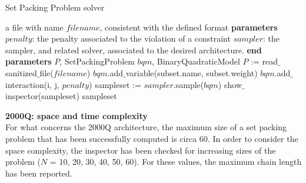 \documentclass[oneside,a4paper]{article}
\begin{document}
\begin{algorithm}
\caption{Set Packing Problem solver}
\begin{algorithmic}[1]
\Require a file with name $filename$, consistent with the defined format
\State \textbf{parameters}
\Indent
    \State $penalty$: the penalty associated to the violation of a constraint
    \State $sampler$: the sampler, and related solver, associated to the desired architecture.
\EndIndent
\State \textbf{end parameters}
\Variables
 \State $P$, SetPackingProblem
 \State $bqm$, BinaryQuadraticModel
\EndVariables
\State $P$ := read$\_$sanitized$\_$file($filename$)  
        \State $bqm$.add$\_$variable(subset.name, subset.weight)   
\EndFor  \label{loop2}
            \State $bqm$.add$\_$interaction(i, j, $penalty$)   
        \EndFor
    \EndFor
\EndFor  \label{loop3}
\State sampleset := $sampler$.sample($bqm$) 
\State show$\_$inspector(sampleset) 
\State \Return sampleset 
\EndProcedure
\end{algorithmic}
\end{algorithm}

\textbf{2000Q: space and time complexity} \\

For what concerns the 2000Q architecture, the maximum size of a set packing problem that has been successfully computed is circa 60. In order to consider the space complexity, the inspector has been checked for increasing sizes of the problem ($N$ = 10, 20, 30, 40, 50, 60). For these values, the maximum chain length has been reported.
\end{document}
